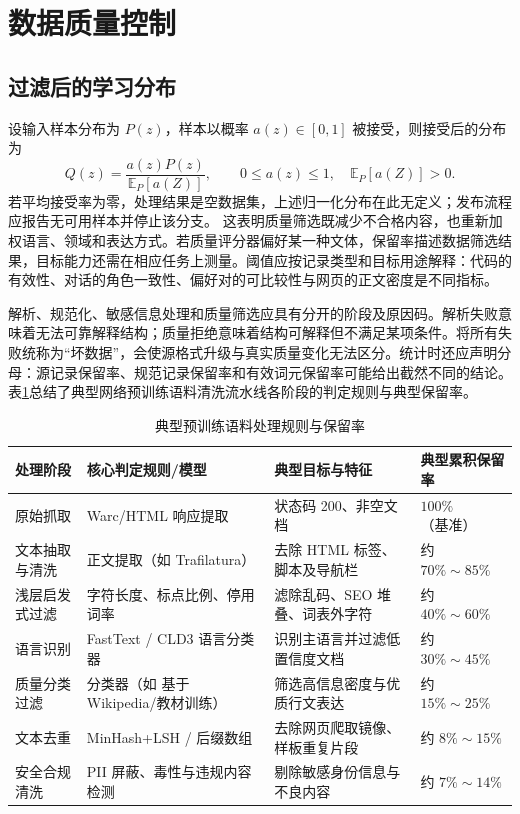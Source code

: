 \documentclass[../textbook.tex]{subfiles}
\begin{document}
\section{数据质量控制}

\subsection{过滤后的学习分布}
设输入样本分布为 $P(z)$，样本以概率 $a(z)\in[0,1]$ 被接受，则接受后的分布为
\begin{equation}
Q(z)=\frac{a(z)P(z)}{\mathbb E_{P}[a(Z)]},\qquad 0\le a(z)\le1,\quad \mathbb E_P[a(Z)]>0.
\label{eq:data-filter}
\end{equation}
若平均接受率为零，处理结果是空数据集，上述归一化分布在此无定义；发布流程应报告无可用样本并停止该分支。
这表明质量筛选既减少不合格内容，也重新加权语言、领域和表达方式。若质量评分器偏好某一种文体，保留率描述数据筛选结果，目标能力还需在相应任务上测量。阈值应按记录类型和目标用途解释：代码的有效性、对话的角色一致性、偏好对的可比较性与网页的正文密度是不同指标。

解析、规范化、敏感信息处理和质量筛选应具有分开的阶段及原因码。解析失败意味着无法可靠解释结构；质量拒绝意味着结构可解释但不满足某项条件。将所有失败统称为“坏数据”，会使源格式升级与真实质量变化无法区分。统计时还应声明分母：源记录保留率、规范记录保留率和有效词元保留率可能给出截然不同的结论。表\ref{tab:data-pipeline-stages}总结了典型网络预训练语料清洗流水线各阶段的判定规则与典型保留率。

\begin{table}[htbp]
\centering
\caption{典型预训练语料处理规则与保留率}
\label{tab:data-pipeline-stages}
\begin{tabularx}{\linewidth}{lp{28mm}p{38mm}X}
\toprule
处理阶段 & 核心判定规则/模型 & 典型目标与特征 & 典型累积保留率 \\
\midrule
原始抓取 & Warc/HTML 响应提取 & 状态码 200、非空文档 & $100\%$（基准） \\
文本抽取与清洗 & 正文提取（如 Trafilatura） & 去除 HTML 标签、脚本及导航栏 & 约 $70\%\sim 85\%$ \\
浅层启发式过滤 & 字符长度、标点比例、停用词率 & 滤除乱码、SEO 堆叠、词表外字符 & 约 $40\%\sim 60\%$ \\
语言识别 & FastText / CLD3 语言分类器 & 识别主语言并过滤低置信度文档 & 约 $30\%\sim 45\%$ \\
质量分类过滤 & 分类器（如 基于 Wikipedia/教材训练） & 筛选高信息密度与优质行文表达 & 约 $15\%\sim 25\%$ \\
文本去重 & MinHash+LSH / 后缀数组 & 去除网页爬取镜像、样板重复片段 & 约 $8\%\sim 15\%$ \\
安全合规清洗 & PII 屏蔽、毒性与违规内容检测 & 剔除敏感身份信息与不良内容 & 约 $7\%\sim 14\%$ \\
\bottomrule
\end{tabularx}
\end{table}
\end{document}
